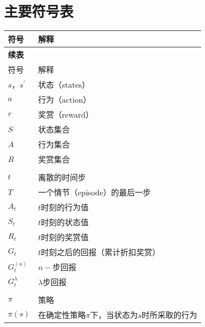 \chapter{主要符号表}
\begin{longtable}{p{2cm}p{11cm}}
 \toprule
符号 & 解释 \\
 \midrule
\endfirsthead
 {\bf 续表}\\
 \toprule
符号 & 解释 \\
 \midrule
\endhead
\endfoot
 \bottomrule
\endlastfoot
$s$，$s^{'} $                           & 状态（states）               \\
$a$                            & 行为（action）                \\
$r$                           & 奖赏（reward）                  \\
$S$                            & 状态集合\\
$A$                            & 行为集合                             \\
$R$                            & 奖赏集合                                    \\
                            &                                         \\
$t$                            & 离散的时间步                                    \\
$T$                            & 一个情节（episode）的最后一步              \\
$A_{t}$                            & $t$时刻的行为值              \\
$S_{t}$                          & $t$时刻的状态值                    \\
$R_{t}$                           & $t$时刻的奖赏值                               \\
$G_{t}$                            & $t$时刻之后的回报（累计折扣奖赏）    \\
$G_{t}^{(n)}$                            & $n-$步回报    \\
$G_{t}^{\lambda}$                            & $\lambda$步回报    \\
                            &                        \\
$\pi$                            & 策略                                              \\
$\pi(s)$     & 在确定性策略$\pi$下，当状态为$s$时所采取的行为                 \\

\end{longtable}

